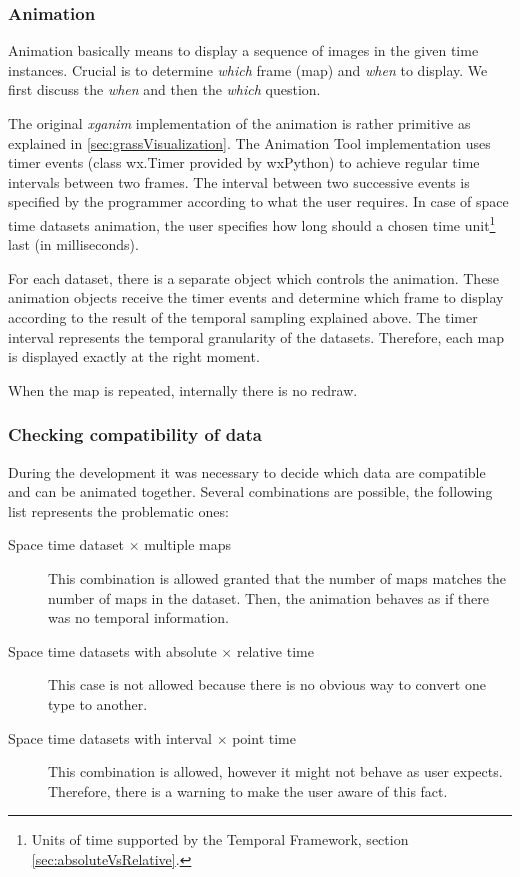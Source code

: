 \documentclass[a4paper,12pt,oneside]{book}
\newcommand{\module}[1]{\textsl{#1}}
\newcommand{\tf}{Temporal Framework\xspace}
\newcommand{\at}{Animation Tool\xspace}
\begin{document}
\subsubsection{Animation}
Animation basically means to display a sequence of images in the given time instances.
Crucial is to determine \emph{which} frame (map) and \emph{when} to display.
We first discuss the \emph{when}  and then the \emph{which} question.


The original \module{xganim} implementation of the animation is rather primitive
as explained in \ref{sec:grassVisualization}.
The \at implementation uses timer events (class wx.Timer provided by wxPython) to achieve regular time intervals between two frames.
The interval between two successive events is specified by the programmer according to what the user requires.
In case of space time datasets animation, the user specifies how long
should a chosen time unit\footnote{Units of time supported by the \tf, section \ref{sec:absoluteVsRelative}.}
last (in milliseconds).

For each dataset, there is a separate object which controls the animation.
These animation objects receive the timer events and determine
which frame to display according to the result of the temporal sampling explained above.
The timer interval represents the temporal granularity of the datasets.
Therefore, each map is displayed exactly at the right moment.

When the map is repeated, internally there is no redraw.



\subsubsection{Checking compatibility of data}
During the development it was necessary to decide which data are compatible and can be animated together.
Several combinations are possible, the following list represents the problematic ones:
\begin{description}
  \item[Space time dataset $\times$ multiple maps]
  This combination is allowed granted that the number of maps matches the number of maps in the dataset.
  Then, the animation behaves as if there was no temporal information.

  \item[Space time datasets with absolute $\times$ relative time]
  This case is not allowed because there is no obvious way to convert one type to another.

  \item[Space time datasets with interval $\times$ point time]
  This combination is allowed, however it might not behave as user expects.
  Therefore, there is a warning to make the user aware of this fact.
 \end{description}
 
\end{document}
